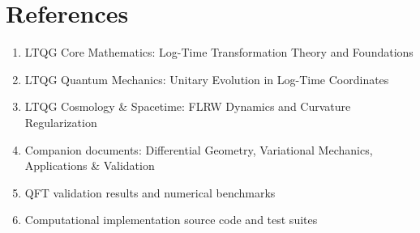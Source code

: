 \documentclass[11pt,a4paper]{article}
\begin{document}
\section*{References}

\begin{enumerate}
\item LTQG Core Mathematics: Log-Time Transformation Theory and Foundations
\item LTQG Quantum Mechanics: Unitary Evolution in Log-Time Coordinates  
\item LTQG Cosmology \& Spacetime: FLRW Dynamics and Curvature Regularization
\item Companion documents: Differential Geometry, Variational Mechanics, Applications \& Validation
\item QFT validation results and numerical benchmarks
\item Computational implementation source code and test suites
\end{enumerate}
\end{document}
